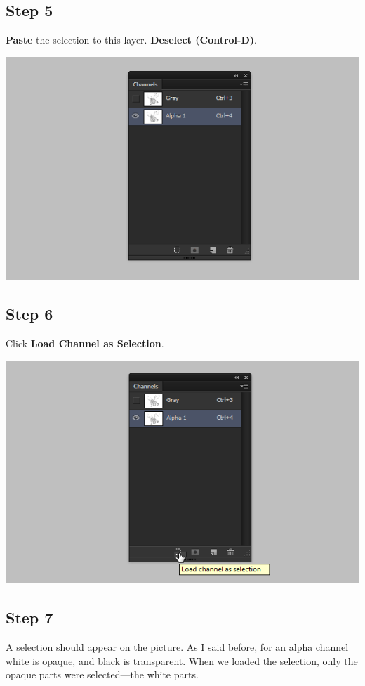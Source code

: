 \subsection{Step 5}
\textbf{Paste} the selection to this layer. \textbf{Deselect (Control-D)}.

\begin{center}
\includegraphics[width=0.7\linewidth]{Photos/quick-lineart-paste}
\end{center}

\subsection{Step 6}
Click \textbf{Load Channel as Selection}.

\begin{center}
\includegraphics[width=0.7\linewidth]{Photos/quick-lineart-select}
\end{center}

\subsection{Step 7}
A selection should appear on the picture. As I said before, for an alpha channel white is opaque, and black is transparent. When we loaded the selection, only the opaque parts were selected—the white parts.

